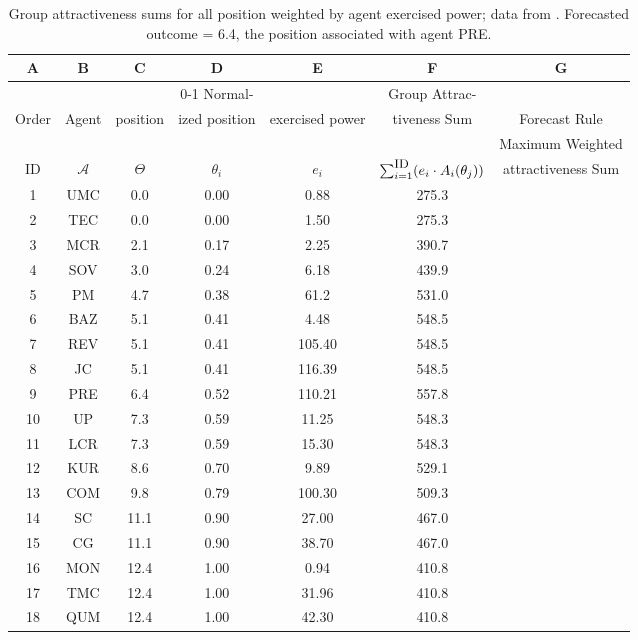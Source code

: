\newpage
\begin{table}[h]
\centering
\begin{tabular}{ccccccc}
\hline
A & \multicolumn{1}{c}{B} & \multicolumn{1}{c}{C} & D & \multicolumn{1}{c}{E} & \multicolumn{1}{c}{F} & G \\ \hline
 & & & \multicolumn{1}{c}{0-1 Normal-} & & \multicolumn{1}{c}{Group Attrac-} &  \\
Order & Agent &	   {position} %
& \multicolumn{1}{c}{ized   {position}} %
&   {exercised power} & \multicolumn{1}{c}{tiveness Sum} & Forecast Rule %
\\
\hline
  & & & & & & Maximum Weighted \\
ID & $\mathcal{A}$ & \multicolumn{1}{c}{$\Theta$} & \multicolumn{1}{c}{$\theta_i$} & \multicolumn{1}{c}{$e_i$} & \multicolumn{1}{c}{$\sum_{i=1}^{\mbox{\small ID}} (e_i\cdot A_i(\theta_j))$} &   {attractiveness} Sum  \\[3pt]
\hline\hline
1 & UMC & 	0.0	& 0.00	 & 0.88 & 275.3 &  \\
2 & TEC	& 0.0	& 0.00 & 1.50 & 275.3 & \\
3 & MCR	 & 2.1 & 0.17 	& 2.25 & 390.7 & \\
4 & SOV	& 3.0 & 0.24	 & 6.18 & 439.9 & \\
5 & PM & 4.7 & 0.38	& 61.2 & 531.0 & \\
6 & BAZ	& 5.1  &	0.41 & 4.48 & 	548.5 & \\
7 & REV	& 5.1	 & 0.41 & 105.40 &	548.5 & \\
8 & JC	& 5.1 & 	0.41	& 116.39 & 548.5 & \\
9 & PRE &	6.4	& 0.52	& 110.21 & 557.8 & \ding{52} \\
10 & UP	& 7.3 & 	0.59	& 11.25 & 548.3 & \\
11 & LCR	& 7.3	 &  0.59	& 15.30 & 548.3 & \\
12 & KUR &	8.6	& 0.70 & 9.89 & 529.1 & \\
13 & COM	 & 9.8 &	0.79	& 100.30 & 509.3 & \\
14 & SC &	11.1	& 0.90	& 27.00 & 467.0 & \\  %
15 & CG	& 11.1 &	0.90 & 38.70 &	467.0 &  \\
16 & MON	 & 12.4 &	1.00	& 0.94 & 410.8  & \\
17 & TMC	 & 12.4	& 1.00 & 31.96 &	410.8 & \\
18 & QUM	 & 12.4 &	1.00 & 42.30 & 	410.8 & \\
\hline
\end{tabular}
\caption{Group   {attractiveness} sums for all   {position} weighted by agent   {exercised power}; data from \cite[Tables 1 and 2]{mesquita_1984}. Forecasted outcome = 6.4, the   {position} associated with agent PRE.}
\label{table:weighted_range_scores}
\end{table}

